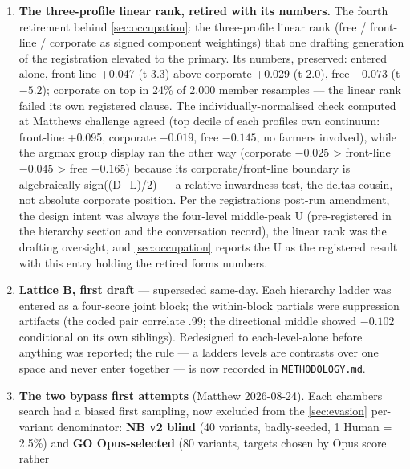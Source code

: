 \begin{enumerate}
  items proved undirected and moved to N; Letters and Memos, zero votes in
  two audit arms, was re-admitted by the four-cell arm; the 64-element
  four-component instrument replaced both).
\item
  \textbf{The three-profile linear rank, retired with its numbers.} The fourth
  retirement behind \cref{sec:occupation}: the three-profile linear rank (free / front-line /
  corporate as signed component weightings) that one drafting generation of
  the registration elevated to the primary. Its numbers, preserved: entered
  alone, front-line +0.047 (t 3.3) above corporate +0.029 (t 2.0), free
  \(-0.073\) (t \(-5.2\)); corporate on top in 24\% of 2,000 member resamples --- the
  linear rank failed its own registered clause. The individually-normalised
  check computed at Matthew\textquotesingle s challenge agreed (top decile of each
  profile\textquotesingle s own continuum: front-line +0.095, corporate \(-0.019\), free
  \(-0.145\), no farmers involved), while the argmax group display ran the
  other way (corporate \(-0.025\) \textgreater{} front-line \(-0.045\) \textgreater{} free \(-0.165\)) because
  its corporate/front-line boundary is algebraically sign((D\(-\)L)/2) --- a
  relative inwardness test, the delta\textquotesingle s cousin, not absolute corporate
  position. Per the registration\textquotesingle s post-run amendment, the design intent
  was always the four-level middle-peak U (pre-registered in the hierarchy
  section and the conversation record), the linear rank was the drafting
  oversight, and \cref{sec:occupation} reports the U as the registered result with this
  entry holding the retired form\textquotesingle s numbers.
\item
  \textbf{Lattice B, first draft} --- superseded same-day. Each hierarchy ladder
  was entered as a four-score joint block; the within-block partials were
  suppression artifacts (the coded pair correlate .99; the directional
  middle showed \(-0.102\) conditional on its own siblings). Redesigned to
  each-level-alone before anything was reported; the rule --- a ladder\textquotesingle s
  levels are contrasts over one space and never enter together --- is now recorded in
  \texttt{METHODOLOGY.md}.
\item
  \textbf{The two bypass first attempts} (Matthew 2026-08-24). Each chamber\textquotesingle s
  search had a biased first sampling, now excluded from the \cref{sec:evasion} per-variant
  denominator: \textbf{NB v2 blind} (40 variants, badly-seeded, 1 Human = 2.5\%)
  and \textbf{GO Opus-selected} (80 variants, targets chosen by Opus score rather

\end{enumerate}
